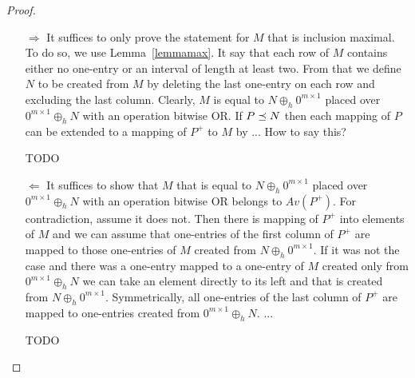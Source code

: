\begin{proof}
\begin{itemize}
\item[$\Rightarrow$] It suffices to only prove the statement for $M$ that is inclusion maximal. To do so, we use Lemma~\ref{lemmamax}. It say that each row of $M$ contains either no one-entry or an interval of length at least two. From that we define $N$ to be created from $M$ by deleting the last one-entry on each row and excluding the last column. Clearly, $M$ is equal to $N\oplus_h0^{m\times1}$ placed over $0^{m\times1}\oplus_hN$ with an operation bitwise OR. If $P\preceq N$ then each mapping of $P$ can be extended to a mapping of $P^+$ to $M$ by ... How to say this?

TODO
\item[$\Leftarrow$] It suffices to show that $M$ that is equal to $N\oplus_h0^{m\times1}$ placed over $0^{m\times1}\oplus_hN$ with an operation bitwise OR belongs to $Av(P^+)$. For contradiction, assume it does not. Then there is mapping of $P^+$ into elements of $M$ and we can assume that one-entries of the first column of $P^+$ are mapped to those one-entries of $M$ created from $N\oplus_h0^{m\times1}$. If it was not the case and there was a one-entry mapped to a one-entry of $M$ created only from $0^{m\times1}\oplus_hN$ we can take an element directly to its left and that is created from $N\oplus_h0^{m\times1}$. Symmetrically, all one-entries of the last column of $P^+$ are mapped to one-entries created from $0^{m\times1}\oplus_hN$. ...

TODO
\end{itemize}
\end{proof}

